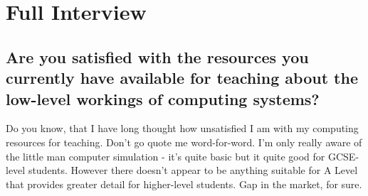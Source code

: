 
\section{Full Interview} \label{sec:full-interview}
    \subsection{Are you satisfied with the resources you currently have available for teaching about the low-level workings of computing systems?}
        Do you know, that I have long thought how unsatisfied I am with my computing resources for teaching. Don't go quote me word-for-word. I'm only really aware of the little man computer simulation - it's quite basic but it quite good for GCSE-level students. However there doesn't appear to be anything suitable for A Level that provides greater detail for higher-level students. Gap in the market, for sure.
    
